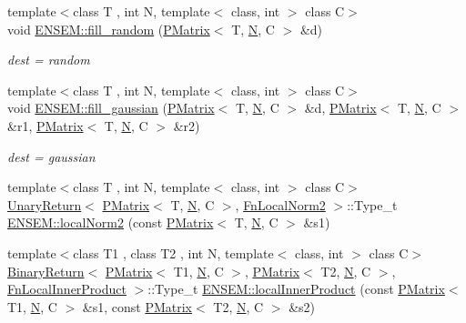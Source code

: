 \begin{DoxyCompactItemize}
{\footnotesize template$<$class T , int N, template$<$ class, int $>$ class C$>$ }\\void \mbox{\hyperlink{group__primmatrix_gaa42f6f1f971a8fb7bf5b5b8b0a5a43ec}{E\+N\+S\+E\+M\+::fill\+\_\+random}} (\mbox{\hyperlink{classENSEM_1_1PMatrix}{P\+Matrix}}$<$ T, \mbox{\hyperlink{operator__name__util_8cc_a7722c8ecbb62d99aee7ce68b1752f337}{N}}, C $>$ \&d)
\begin{DoxyCompactList}\small\item\em dest = random \end{DoxyCompactList}\item 
{\footnotesize template$<$class T , int N, template$<$ class, int $>$ class C$>$ }\\void \mbox{\hyperlink{group__primmatrix_gaad23aac5e121c759d15b6153996bdf9e}{E\+N\+S\+E\+M\+::fill\+\_\+gaussian}} (\mbox{\hyperlink{classENSEM_1_1PMatrix}{P\+Matrix}}$<$ T, \mbox{\hyperlink{operator__name__util_8cc_a7722c8ecbb62d99aee7ce68b1752f337}{N}}, C $>$ \&d, \mbox{\hyperlink{classENSEM_1_1PMatrix}{P\+Matrix}}$<$ T, \mbox{\hyperlink{operator__name__util_8cc_a7722c8ecbb62d99aee7ce68b1752f337}{N}}, C $>$ \&r1, \mbox{\hyperlink{classENSEM_1_1PMatrix}{P\+Matrix}}$<$ T, \mbox{\hyperlink{operator__name__util_8cc_a7722c8ecbb62d99aee7ce68b1752f337}{N}}, C $>$ \&r2)
\begin{DoxyCompactList}\small\item\em dest = gaussian \end{DoxyCompactList}\item 
{\footnotesize template$<$class T , int N, template$<$ class, int $>$ class C$>$ }\\\mbox{\hyperlink{structENSEM_1_1UnaryReturn}{Unary\+Return}}$<$ \mbox{\hyperlink{classENSEM_1_1PMatrix}{P\+Matrix}}$<$ T, \mbox{\hyperlink{operator__name__util_8cc_a7722c8ecbb62d99aee7ce68b1752f337}{N}}, C $>$, \mbox{\hyperlink{structENSEM_1_1FnLocalNorm2}{Fn\+Local\+Norm2}} $>$\+::Type\+\_\+t \mbox{\hyperlink{group__primmatrix_ga701b80e6864ced6a31a2abc314946f2f}{E\+N\+S\+E\+M\+::local\+Norm2}} (const \mbox{\hyperlink{classENSEM_1_1PMatrix}{P\+Matrix}}$<$ T, \mbox{\hyperlink{operator__name__util_8cc_a7722c8ecbb62d99aee7ce68b1752f337}{N}}, C $>$ \&s1)
\item 
{\footnotesize template$<$class T1 , class T2 , int N, template$<$ class, int $>$ class C$>$ }\\\mbox{\hyperlink{structENSEM_1_1BinaryReturn}{Binary\+Return}}$<$ \mbox{\hyperlink{classENSEM_1_1PMatrix}{P\+Matrix}}$<$ T1, \mbox{\hyperlink{operator__name__util_8cc_a7722c8ecbb62d99aee7ce68b1752f337}{N}}, C $>$, \mbox{\hyperlink{classENSEM_1_1PMatrix}{P\+Matrix}}$<$ T2, \mbox{\hyperlink{operator__name__util_8cc_a7722c8ecbb62d99aee7ce68b1752f337}{N}}, C $>$, \mbox{\hyperlink{structENSEM_1_1FnLocalInnerProduct}{Fn\+Local\+Inner\+Product}} $>$\+::Type\+\_\+t \mbox{\hyperlink{group__primmatrix_ga8ba784b1249c948dcff5b8fe086e2eb5}{E\+N\+S\+E\+M\+::local\+Inner\+Product}} (const \mbox{\hyperlink{classENSEM_1_1PMatrix}{P\+Matrix}}$<$ T1, \mbox{\hyperlink{operator__name__util_8cc_a7722c8ecbb62d99aee7ce68b1752f337}{N}}, C $>$ \&s1, const \mbox{\hyperlink{classENSEM_1_1PMatrix}{P\+Matrix}}$<$ T2, \mbox{\hyperlink{operator__name__util_8cc_a7722c8ecbb62d99aee7ce68b1752f337}{N}}, C $>$ \&s2)

\end{DoxyCompactItemize}

